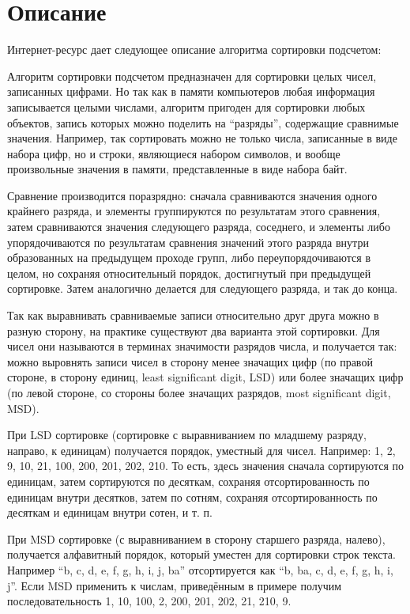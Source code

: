 \section{Описание}

Интернет-ресурс \cite{wikipedia_radix_sort} дает следующее описание алгоритма сортировки подсчетом:


Алгоритм сортировки подсчетом предназначен для сортировки целых чисел, записанных цифрами. Но так как в памяти компьютеров любая информация записывается целыми числами, алгоритм пригоден для сортировки любых объектов, запись которых можно поделить на \enquote{разряды}, содержащие сравнимые значения. Например, так сортировать можно не только числа, записанные в виде набора цифр, но и строки, являющиеся набором символов, и вообще произвольные значения в памяти, представленные в виде набора байт.

Сравнение производится поразрядно: сначала сравниваются значения одного крайнего разряда, и элементы группируются по результатам этого сравнения, затем сравниваются значения следующего разряда, соседнего, и элементы либо упорядочиваются по результатам сравнения значений этого разряда внутри образованных на предыдущем проходе групп, либо переупорядочиваются в целом, но сохраняя относительный порядок, достигнутый при предыдущей сортировке. Затем аналогично делается для следующего разряда, и так до конца.

Так как выравнивать сравниваемые записи относительно друг друга можно в разную сторону, на практике существуют два варианта этой сортировки. Для чисел они называются в терминах значимости разрядов числа, и получается так: можно выровнять записи чисел в сторону менее значащих цифр (по правой стороне, в сторону единиц, least significant digit, LSD) или более значащих цифр (по левой стороне, со стороны более значащих разрядов, most significant digit, MSD).

При LSD сортировке (сортировке с выравниванием по младшему разряду, направо, к единицам) получается порядок, уместный для чисел. Например: 1, 2, 9, 10, 21, 100, 200, 201, 202, 210. То есть, здесь значения сначала сортируются по единицам, затем сортируются по десяткам, сохраняя отсортированность по единицам внутри десятков, затем по сотням, сохраняя отсортированность по десяткам и единицам внутри сотен, и т. п.

При MSD сортировке (с выравниванием в сторону старшего разряда, налево), получается алфавитный порядок, который уместен для сортировки строк текста. Например \enquote{b, c, d, e, f, g, h, i, j, ba} отсортируется как \enquote{b, ba, c, d, e, f, g, h, i, j}. Если MSD применить к числам, приведённым в примере получим последовательность 1, 10, 100, 2, 200, 201, 202, 21, 210, 9.

